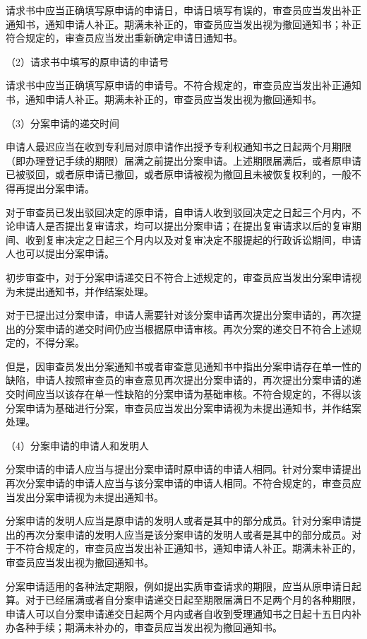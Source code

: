 请求书中应当正确填写原申请的申请日，申请日填写有误的，审查员应当发出补正通知书，通知申请人补正。期满未补正的，审查员应当发出视为撤回通知书；补正符合规定的，审查员应当发出重新确定申请日通知书。

{\setlength{\parindent}{17.1bp}（2）请求书中填写的原申请的申请号\par}

请求书中应当正确填写原申请的申请号。不符合规定的，审查员应当发出补正通知书，通知申请人补正。期满未补正的，审查员应当发出视为撤回通知书。

{\setlength{\parindent}{17.1bp}（3）分案申请的递交时间\par}

申请人最迟应当在收到专利局对原申请作出授予专利权通知书之日起两个月期限（即办理登记手续的期限）届满之前提出分案申请。上述期限届满后，或者原申请已被驳回，或者原申请已撤回，或者原申请被视为撤回且未被恢复权利的，一般不得再提出分案申请。

对于审查员已发出驳回决定的原申请，自申请人收到驳回决定之日起三个月内，不论申请人是否提出复审请求，均可以提出分案申请；在提出复审请求以后的复审期间、收到复审决定之日起三个月内以及对复审决定不服提起的行政诉讼期间，申请人也可以提出分案申请。

初步审查中，对于分案申请递交日不符合上述规定的，审查员应当发出分案申请视为未提出通知书，并作结案处理。

对于已提出过分案申请，申请人需要针对该分案申请再次提出分案申请的，再次提出的分案申请的递交时间仍应当根据原申请审核。再次分案的递交日不符合上述规定的，不得分案。

但是，因审查员发出分案通知书或者审查意见通知书中指出分案申请存在单一性的缺陷，申请人按照审查员的审查意见再次提出分案申请的，再次提出分案申请的递交时间应当以该存在单一性缺陷的分案申请为基础审核。不符合规定的，不得以该分案申请为基础进行分案，审查员应当发出分案申请视为未提出通知书，并作结案处理。

{\setlength{\parindent}{17.1bp}（4）分案申请的申请人和发明人\par}

分案申请的申请人应当与提出分案申请时原申请的申请人相同。针对分案申请提出再次分案申请的申请人应当与该分案申请的申请人相同。不符合规定的，审查员应当发出分案申请视为未提出通知书。

分案申请的发明人应当是原申请的发明人或者是其中的部分成员。针对分案申请提出的再次分案申请的发明人应当是该分案申请的发明人或者是其中的部分成员。对于不符合规定的，审查员应当发出补正通知书，通知申请人补正。期满未补正的，审查员应当发出视为撤回通知书。

分案申请适用的各种法定期限，例如提出实质审查请求的期限，应当从原申请日起算。对于已经届满或者自分案申请递交日起至期限届满日不足两个月的各种期限，申请人可以自分案申请递交日起两个月内或者自收到受理通知书之日起十五日内补办各种手续；期满未补办的，审查员应当发出视为撤回通知书。

